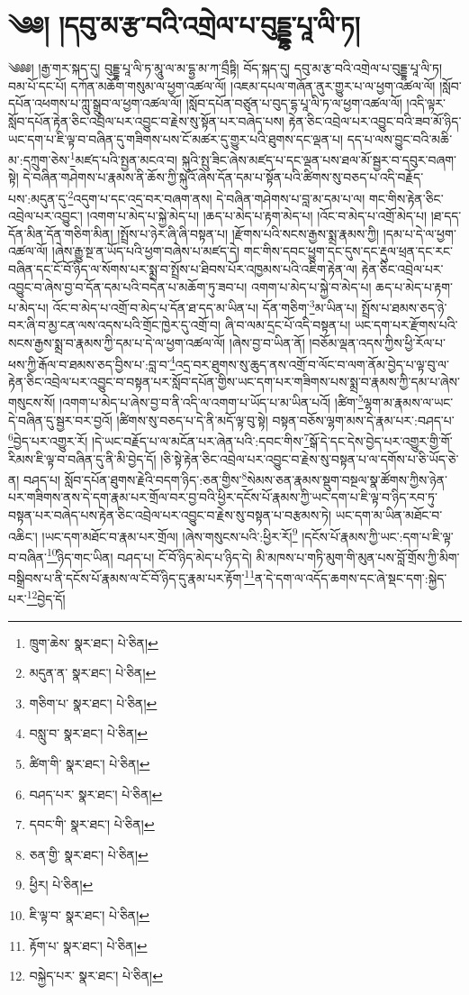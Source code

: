 \setcounter{footnote}{0} 
\chapter{༄༅། །དབུ་མ་རྩ་བའི་འགྲེལ་པ་བུདྡྷ་པཱ་ལི་ཏ།}༄༅༅། །རྒྱ་གར་སྐད་དུ། བུདྡྷ་པཱ་ལི་ཏ་མཱུ་ལ་མ་དྷྱ་མ་ཀ་བྲྀཏྟི། བོད་སྐད་དུ། དབུ་མ་རྩ་བའི་འགྲེལ་པ་བུདྡྷ་པཱ་ལི་ཏ། བམ་པོ་དང་པོ། དཀོན་མཆོག་གསུམ་ལ་ཕྱག་འཚལ་ལོ། །འཇམ་དཔལ་གཞོན་ནུར་གྱུར་པ་ལ་ཕྱག་འཚལ་ལོ། །སློབ་དཔོན་འཕགས་པ་ཀླུ་སྒྲུབ་ལ་ཕྱག་འཚལ་ལོ། །སློབ་དཔོན་བཙུན་པ་བུད་དྷ་པཱ་ལི་ཏ་ལ་ཕྱག་འཚལ་ལོ། །འདི་ལྟར་སློབ་དཔོན་རྟེན་ཅིང་འབྲེལ་པར་འབྱུང་བ་རྗེས་སུ་སྟོན་པར་བཞེད་པས། རྟེན་ཅིང་འབྲེལ་པར་འབྱུང་བའི་ཟབ་མོ་ཉིད་ཡང་དག་པ་ཇི་ལྟ་བ་བཞིན་དུ་གཟིགས་པས་ངོ་མཚར་དུ་གྱུར་པའི་ཐུགས་དང་ལྡན་པ། དད་པ་ལས་བྱུང་བའི་མཆི་མ་:དཀྲུག་ཅེས་\footnote{ཁྲུག་ཆེས་  སྣར་ཐང་།  པེ་ཅིན། }མཛད་པའི་སྤྱན་མངའ་བ། སྐུའི་སྤུ་ཟིང་ཞེས་མཛད་པ་དང་ལྡན་པས་ཐལ་མོ་སྦྱར་བ་དབུར་བཞག་སྟེ། དེ་བཞིན་གཤེགས་པ་རྣམས་ནི་ཆོས་ཀྱི་སྐུའོ་ཞེས་དོན་དམ་པ་སྟོན་པའི་ཚིགས་སུ་བཅད་པ་འདི་བརྗོད་པས་:མདུན་དུ་\footnote{མདུན་ན་  སྣར་ཐང་།  པེ་ཅིན། }འདུག་པ་དང་འདྲ་བར་བཞག་ནས། དེ་བཞིན་གཤེགས་པ་བླ་མ་དམ་པ་ལ། གང་གིས་རྟེན་ཅིང་འབྲེལ་པར་འབྱུང་། །འགག་པ་མེད་པ་སྐྱེ་མེད་པ། །ཆད་པ་མེད་པ་རྟག་མེད་པ། །འོང་བ་མེད་པ་འགྲོ་མེད་པ། །ཐ་དད་དོན་མིན་དོན་གཅིག་མིན། །སྤྲོས་པ་ཉེར་ཞི་ཞི་བསྟན་པ། །རྫོགས་པའི་སངས་རྒྱས་སྨྲ་རྣམས་ཀྱི། །དམ་པ་དེ་ལ་ཕྱག་འཚལ་ལོ། །ཞེས་རྒྱུ་སྔ་ན་ཡོད་པའི་ཕྱག་བཞེས་པ་མཛད་དེ། གང་གིས་དབང་ཕྱུག་དང་དུས་དང་རྡུལ་ཕྲན་དང་རང་བཞིན་དང་ངོ་བོ་ཉིད་ལ་སོགས་པར་སྨྲ་བ་སྤྲོས་པ་ཐིབས་པོར་འཁྱམས་པའི་འཇིག་རྟེན་ལ། རྟེན་ཅིང་འབྲེལ་པར་འབྱུང་བ་ཞེས་བྱ་བ་དོན་དམ་པའི་བདེན་པ་མཆོག་ཏུ་ཟབ་པ། འགག་པ་མེད་པ་སྐྱེ་བ་མེད་པ། ཆད་པ་མེད་པ་རྟག་པ་མེད་པ། འོང་བ་མེད་པ་འགྲོ་བ་མེད་པ་དོན་ཐ་དད་མ་ཡིན་པ། དོན་གཅིག་\footnote{གཅིག་པ་  སྣར་ཐང་།  པེ་ཅིན། }མ་ཡིན་པ། སྤྲོས་པ་ཐམས་ཅད་ཉེ་བར་ཞི་བ་མྱ་ངན་ལས་འདས་པའི་གྲོང་ཁྱེར་དུ་འགྲོ་བ། ཞི་བ་ལམ་དྲང་པོ་འདི་བསྟན་པ། ཡང་དག་པར་རྫོགས་པའི་སངས་རྒྱས་སྨྲ་བ་རྣམས་ཀྱི་དམ་པ་དེ་ལ་ཕྱག་འཚལ་ལོ། །ཞེས་བྱ་བ་ཡིན་ནོ། །བཅོམ་ལྡན་འདས་ཀྱིས་ཕྱི་རོལ་པ་ཕས་ཀྱི་རྒོལ་བ་ཐམས་ཅད་བྱིས་པ་:བླ་བ་\footnote{བསླུ་བ་  སྣར་ཐང་།  པེ་ཅིན། }འདྲ་བར་ཐུགས་སུ་ཆུད་ནས་འགྲོ་བ་ལོང་བ་ལག་ནོམ་བྱེད་པ་ལྟ་བུ་ལ་རྟེན་ཅིང་འབྲེལ་པར་འབྱུང་བ་བསྟན་པར་སློབ་དཔོན་གྱིས་ཡང་དག་པར་གཟིགས་པས་སྨྲ་བ་རྣམས་ཀྱི་དམ་པ་ཞེས་གསུངས་སོ། །འགག་པ་མེད་པ་ཞེས་བྱ་བ་ནི་འདི་ལ་འགག་པ་ཡོད་པ་མ་ཡིན་པའོ། །ཚིག་\footnote{ཚིག་གི་  སྣར་ཐང་།  པེ་ཅིན། }ལྷག་མ་རྣམས་ལ་ཡང་དེ་བཞིན་དུ་སྦྱར་བར་བྱའོ། །ཚིགས་སུ་བཅད་པ་དེ་ནི་མདོ་ལྟ་བུ་སྟེ། བསྟན་བཅོས་ལྷག་མས་དེ་རྣམ་པར་:བཤད་པ་\footnote{བཤད་པར་  སྣར་ཐང་།  པེ་ཅིན། }བྱེད་པར་འགྱུར་རོ། །དེ་ཡང་བརྗོད་པ་ལ་མངོན་པར་ཞེན་པའི་:དབང་གིས་\footnote{དབང་གི་  སྣར་ཐང་།  པེ་ཅིན། }སྒོ་དེ་དང་དེས་བྱེད་པར་འགྱུར་གྱི་གོ་རིམས་ཇི་ལྟ་བ་བཞིན་དུ་ནི་མི་བྱེད་དོ། །ཅི་སྟེ་རྟེན་ཅིང་འབྲེལ་པར་འབྱུང་བ་རྗེས་སུ་བསྟན་པ་ལ་དགོས་པ་ཅི་ཡོད་ཅེ་ན། བཤད་པ། སློབ་དཔོན་ཐུགས་རྗེའི་བདག་ཉིད་:ཅན་གྱིས་\footnote{ཅན་གྱི་  སྣར་ཐང་།  པེ་ཅིན། }སེམས་ཅན་རྣམས་སྡུག་བསྔལ་སྣ་ཚོགས་ཀྱིས་ཉེན་པར་གཟིགས་ནས་དེ་དག་རྣམ་པར་གྲོལ་བར་བྱ་བའི་ཕྱིར་དངོས་པོ་རྣམས་ཀྱི་ཡང་དག་པ་ཇི་ལྟ་བ་ཉིད་རབ་ཏུ་བསྟན་པར་བཞེད་པས་རྟེན་ཅིང་འབྲེལ་པར་འབྱུང་བ་རྗེས་སུ་བསྟན་པ་བརྩམས་ཏེ། ཡང་དག་མ་ཡིན་མཐོང་བ་འཆིང་། །ཡང་དག་མཐོང་བ་རྣམ་པར་གྲོལ། །ཞེས་གསུངས་པའི་:ཕྱིར་རོ།\footnote{ཕྱིར།  པེ་ཅིན། } །དངོས་པོ་རྣམས་ཀྱི་ཡང་:དག་པ་ཇི་ལྟ་བ་བཞིན་\footnote{ཇི་ལྟ་བ་  སྣར་ཐང་།  པེ་ཅིན། }ཉིད་གང་ཡིན། བཤད་པ། ངོ་བོ་ཉིད་མེད་པ་ཉིད་དེ། མི་མཁས་པ་གཏི་མུག་གི་མུན་པས་བློ་གྲོས་ཀྱི་མིག་བསྒྲིབས་པ་ནི་དངོས་པོ་རྣམས་ལ་ངོ་བོ་ཉིད་དུ་རྣམ་པར་རྟོག་\footnote{རྟོག་པ་  སྣར་ཐང་།  པེ་ཅིན། }ན་དེ་དག་ལ་འདོད་ཆགས་དང་ཞེ་སྡང་དག་:སྐྱེད་པར་\footnote{བསྐྱེད་པར་  སྣར་ཐང་།  པེ་ཅིན། }བྱེད་དོ། 